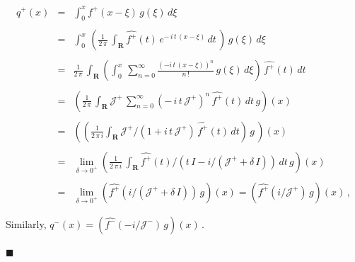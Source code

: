 \documentclass[10pt,a4paper]{amsart}
\begin{document}
\begin{Proof}
\begin{equation}
  \begin{array}{rcl}
q^+(x) & = & \displaystyle \int_0^x f^+(x-\xi) \, g(\xi) \, d\xi \\
    && \\
    & = & \displaystyle \int_0^x \,\left(\frac{1}{2\,\pi} \, \int_{\mathbf R}
\widehat{f^+}(t) \, e^{-\,i\,t\,(x - \xi)}\,dt \,
\right)\,g(\xi)\,d\xi \\  
&& \\
& = & \displaystyle \frac{1}{2\,\pi} \,\int_{\mathbf R} \left(\int_0^x
\,\sum_{n=0}^\infty  
         \frac{(-i\,t\,(x-\xi))^n}{n\,!} \, 
         g(\xi)\,d\xi\right) \, \widehat{f^+}(t) \, dt \\ 
         && \\
& = & \displaystyle \left(\frac{1}{2\,\pi} \, \int_{\mathbf R}
         {\mathcal J}^+ \, 
         \sum_{n=0}^\infty \left(-\,i\,t\,{\mathcal J}^+\right)^n \,
         \widehat{f^+}(t) \, dt \, g\right)(x) \\ 
         && \\
& = & \displaystyle \left(\left(\frac{1}{2\,\pi\,i} \int_{\mathbf R} {\mathcal
           J}^+/\left(1 + i\,t\,{\mathcal J}^+\right) \,
         \widehat{f^+}(t) 
         \, dt\right) \, g \, \right)(x) \\
&& \\
     & = & \displaystyle \lim_{\delta \to 0^+}\left(\frac{1}{2\,\pi\,i}\,\int_{\mathbf R}
      \widehat{f^+}(t)/\left(t\,I - i/\left({\mathcal
          J}^++\delta\,I\right)\right) \, dt \, 
      g\right)(x) \\ 
      && \\
      & = & \displaystyle \lim_{\delta \to 0^+}
      \left(\widehat{f^+}\left(i/\left({\mathcal J}^+ +
      \delta\,I\right)\right)\,g\right)(x) = 
      \left(\widehat{f^+}\left(i/{\mathcal J}^+\right)\,g\right)(x)\,,
  \end{array}
      \label{equation:2.12}
\end{equation} 

\noindent Similarly, $q^-(x) = \left(\widehat{f^-}\left(-i/{\mathcal
  J}^-\right)\,g\right)(x)$\,.  
  \end{Proof} $\blacksquare$
\end{document}
